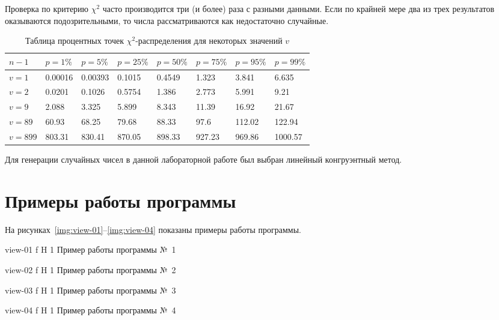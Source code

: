 \documentclass{bmstu}
\begin{document}
Проверка по критерию $\chi^2$ часто производится три (и более) раза с разными данными. 
Если по крайней мере два из трех результатов оказываются подозрительными, то числа рассматриваются как недостаточно случайные.

\begin{table}[H]
\caption{Таблица процентных точек $\chi^2$-распределения для некоторых значений $v$}
\label{tabular:comparison}
\begin{tabular}{|p{1.25cm}|p{1.75cm}|p{1.75cm}|p{2cm}|p{2cm}|p{2cm}|p{2cm}|p{2cm}|}
\hline
$n - 1$ & $p = 1\%$ & $p = 5\%$ & $p = 25\%$ & $p = 50\%$ & $p = 75\%$ & $p = 95\%$ & $p = 99\%$
\tabularnewline
\hline
$v = 1$ & 0.00016 & 0.00393 & 0.1015 & 0.4549 & 1.323 & 3.841 & 6.635
\tabularnewline
\hline
$v = 2$ & 0.0201 & 0.1026 & 0.5754 & 1.386 & 2.773 & 5.991 & 9.21
\tabularnewline
\hline
$v = 9$ & 2.088 & 3.325 & 5.899 & 8.343 & 11.39 & 16.92 & 21.67
\tabularnewline
\hline
$v = 89$ & 60.93 & 68.25 & 79.68 & 88.33 & 97.6 & 112.02 & 122.94
\tabularnewline
\hline
$v = 899$ & 803.31 & 830.41 & 870.05 & 898.33 & 927.23 & 969.86 & 1000.57
\tabularnewline
\hline
\end{tabular}
\end{table}

Для генерации случайных чисел в данной лабораторной работе был выбран линейный конгруэнтный метод.

\chapter{Примеры работы программы}

На рисунках~\ref{img:view-01}--\ref{img:view-04} показаны примеры работы программы.

    {view-01}
    {f}
    {H}
    {1\textwidth}
    {Пример работы программы №~1}
    
    {view-02}
    {f}
    {H}
    {1\textwidth}
    {Пример работы программы №~2}
    
    {view-03}
    {f}
    {H}
    {1\textwidth}
    {Пример работы программы №~3}
    
    {view-04}
    {f}
    {H}
    {1\textwidth}
    {Пример работы программы №~4}
\end{document}
